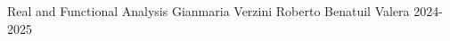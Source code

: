 \documentclass{classNotes}
\def\author{Roberto Benatuil Valera}
\def\prof{Gianmaria Verzini}
\def\course{Real and Functional Analysis}
\def\academicyear{2024-2025}
\begin{document}
\frontpage
    {\course}
    {\prof}
    {\author}
    {\academicyear}

\tableofcontents



\end{document}
